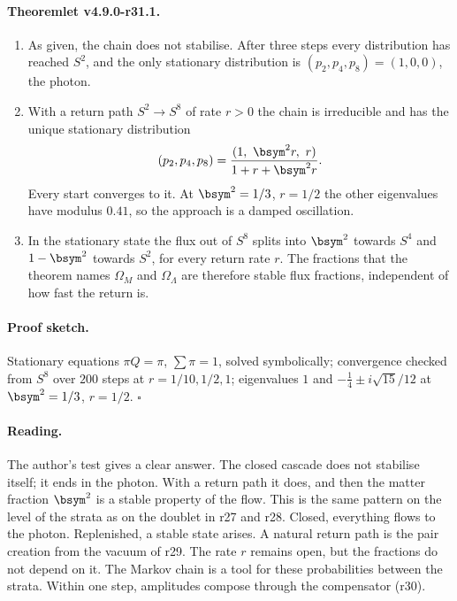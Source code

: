 \paragraph{Theoremlet v4.9.0-r31.1.}
\begin{enumerate}[leftmargin=2em]
\item[(a)] As given, the chain does not stabilise.  After three steps every distribution has reached \(S^2\), and the only stationary
distribution is \((p_2,p_4,p_8)=(1,0,0)\), the photon.
\item[(b)] With a return path \(S^2\to S^8\) of rate \(r>0\) the chain is irreducible and has the unique stationary distribution
\[
(p_2,p_4,p_8)=\frac{(1,\ \bsym^2r,\ r)}{1+r+\bsym^2r}.
\]
Every start converges to it.  At \(\bsym^2=1/3\), \(r=1/2\) the other eigenvalues have modulus \(0.41\), so the approach is a damped
oscillation.
\item[(c)] In the stationary state the flux out of \(S^8\) splits into \(\bsym^2\) towards \(S^4\) and \(1-\bsym^2\) towards \(S^2\), for every return
rate \(r\).  The fractions that the theorem names \(\Omega_M\) and \(\Omega_\Lambda\) are therefore stable flux fractions, independent of how
fast the return is.
\end{enumerate}

\paragraph{Proof sketch.}
Stationary equations \(\pi Q=\pi\), \(\sum\pi=1\), solved symbolically; convergence checked from \(S^8\) over \(200\) steps at
\(r=1/10,1/2,1\); eigenvalues \(1\) and \(-\tfrac14\pm i\sqrt{15}/12\) at \(\bsym^2=1/3\), \(r=1/2\).  \(\square\)

\paragraph{Reading.}
The author's test gives a clear answer.  The closed cascade does not stabilise itself; it ends in the photon.  With a return path it
does, and then the matter fraction \(\bsym^2\) is a stable property of the flow.  This is the same pattern on the level of the strata as on
the doublet in r27 and r28.  Closed, everything flows to the photon.  Replenished, a stable state arises.  A natural return path is the
pair creation from the vacuum of r29.  The rate \(r\) remains open, but the fractions do not depend on it.  The Markov chain is a
tool for these probabilities between the strata.  Within one step, amplitudes compose through the compensator (r30).

